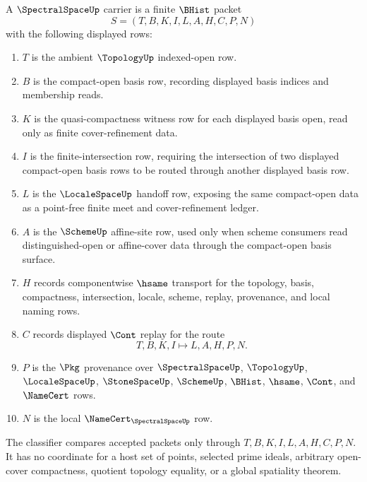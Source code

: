 \begin{definition}
\label{def:spectral-space-carrier}
A $\SpectralSpaceUp$ carrier is a finite $\BHist$ packet
$$
S=(T,B,K,I,L,A,H,C,P,N)
$$
with the following displayed rows:
\begin{enumerate}
\item $T$ is the ambient $\TopologyUp$ indexed-open row.
\item $B$ is the compact-open basis row, recording displayed basis indices and membership reads.
\item $K$ is the quasi-compactness witness row for each displayed basis open, read only as finite cover-refinement data.
\item $I$ is the finite-intersection row, requiring the intersection of two displayed compact-open basis rows to be routed through another displayed basis row.
\item $L$ is the $\LocaleSpaceUp$ handoff row, exposing the same compact-open data as a point-free finite meet and cover-refinement ledger.
\item $A$ is the $\SchemeUp$ affine-site row, used only when scheme consumers read distinguished-open or affine-cover data through the compact-open basis surface.
\item $H$ records componentwise $\hsame$ transport for the topology, basis, compactness, intersection, locale, scheme, replay, provenance, and local naming rows.
\item $C$ records displayed $\Cont$ replay for the route
$$
T,B,K,I \longmapsto L,A,H,P,N .
$$
\item $P$ is the $\Pkg$ provenance over $\SpectralSpaceUp$, $\TopologyUp$, $\LocaleSpaceUp$, $\StoneSpaceUp$, $\SchemeUp$, $\BHist$, $\hsame$, $\Cont$, and $\NameCert$ rows.
\item $N$ is the local $\NameCert_{\SpectralSpaceUp}$ row.
\end{enumerate}
The classifier compares accepted packets only through $T,B,K,I,L,A,H,C,P,N$. It has no coordinate for a host set of points, selected prime ideals, arbitrary open-cover compactness, quotient topology equality, or a global spatiality theorem.
\end{definition}

